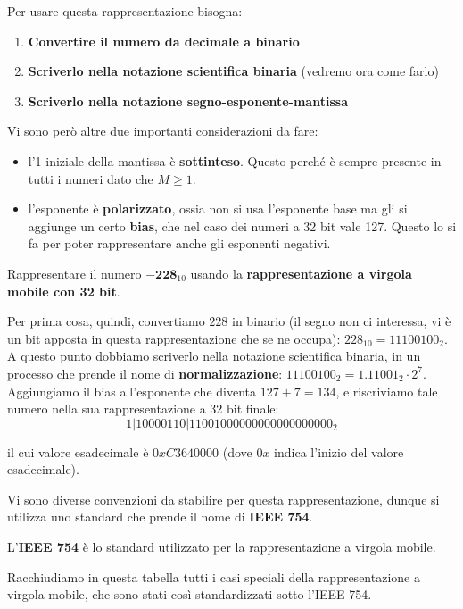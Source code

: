 \documentclass[11pt, a4paper, titlepage, oneside]{scrbook}
\begin{document}
Per usare questa rappresentazione bisogna:
\begin{enumerate}[label=\arabic*°]
    \item \textbf{Convertire il numero da decimale a binario}
    \item \textbf{Scriverlo nella notazione scientifica binaria} (vedremo ora come farlo)
    \item \textbf{Scriverlo nella notazione segno-esponente-mantissa}
\end{enumerate}

Vi sono però altre due importanti considerazioni da fare:
\begin{itemize}
    \item l'1 iniziale della mantissa è \textbf{sottinteso}. Questo perché è sempre presente in tutti i numeri dato che $M \geq 1$.
    \item l'esponente è \textbf{polarizzato}, ossia non si usa l'esponente base ma gli si aggiunge un certo \textbf{bias}, che nel caso dei numeri a 32 bit vale 127. Questo lo si fa per poter rappresentare anche gli esponenti negativi.
\end{itemize}

\Esempio \nopagebreak

Rappresentare il numero $\bm{-228}_{10}$ usando la \textbf{rappresentazione a virgola mobile con 32 bit}. \nopagebreak

Per prima cosa, quindi, convertiamo $228$ in binario (il segno non ci interessa, vi è un bit apposta in questa rappresentazione che se ne occupa): $228_{10} = 11100100_2$. A questo punto dobbiamo scriverlo nella notazione scientifica binaria, in un processo che prende il nome di \textbf{normalizzazione}: $11100100_2 = 1.11001_2 \cdot 2^7$. Aggiungiamo il bias all'esponente che diventa $127 + 7 = 134$, e riscriviamo tale numero nella sua rappresentazione a 32 bit finale:
\[
1 | 10000110 | 11001000000000000000000_2
\]

il cui valore esadecimale è $0xC3640000$ (dove $0x$ indica l'inizio del valore esadecimale).

Vi sono diverse convenzioni da stabilire per questa rappresentazione, dunque si utilizza uno standard che prende il nome di \textbf{IEEE 754}.

\begin{Definizione}[IEEE 754]
\label{def-IEEE754}
L'\textbf{IEEE 754} è lo standard utilizzato per la rappresentazione a virgola mobile.
\end{Definizione}

Racchiudiamo in questa tabella tutti i casi speciali della rappresentazione a virgola mobile, che sono stati così standardizzati sotto l'IEEE 754.
\end{document}
